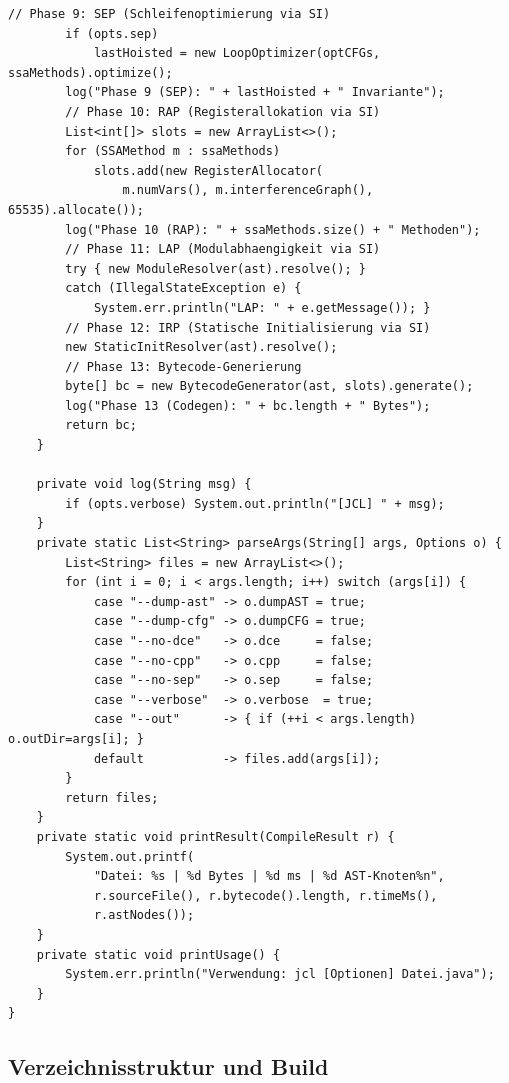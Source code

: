 ﻿\documentclass[a4paper,12pt]{article}
\theoremstyle{definition}
\begin{document}
\begin{lstlisting}[style=javastyle,
    caption={JCLCompiler.java -- vollstaendige 13-Phasen-Pipeline}]
        // Phase 9: SEP (Schleifenoptimierung via SI)
        if (opts.sep)
            lastHoisted = new LoopOptimizer(optCFGs, ssaMethods).optimize();
        log("Phase 9 (SEP): " + lastHoisted + " Invariante");
        // Phase 10: RAP (Registerallokation via SI)
        List<int[]> slots = new ArrayList<>();
        for (SSAMethod m : ssaMethods)
            slots.add(new RegisterAllocator(
                m.numVars(), m.interferenceGraph(), 65535).allocate());
        log("Phase 10 (RAP): " + ssaMethods.size() + " Methoden");
        // Phase 11: LAP (Modulabhaengigkeit via SI)
        try { new ModuleResolver(ast).resolve(); }
        catch (IllegalStateException e) {
            System.err.println("LAP: " + e.getMessage()); }
        // Phase 12: IRP (Statische Initialisierung via SI)
        new StaticInitResolver(ast).resolve();
        // Phase 13: Bytecode-Generierung
        byte[] bc = new BytecodeGenerator(ast, slots).generate();
        log("Phase 13 (Codegen): " + bc.length + " Bytes");
        return bc;
    }

    private void log(String msg) {
        if (opts.verbose) System.out.println("[JCL] " + msg);
    }
    private static List<String> parseArgs(String[] args, Options o) {
        List<String> files = new ArrayList<>();
        for (int i = 0; i < args.length; i++) switch (args[i]) {
            case "--dump-ast" -> o.dumpAST = true;
            case "--dump-cfg" -> o.dumpCFG = true;
            case "--no-dce"   -> o.dce     = false;
            case "--no-cpp"   -> o.cpp     = false;
            case "--no-sep"   -> o.sep     = false;
            case "--verbose"  -> o.verbose  = true;
            case "--out"      -> { if (++i < args.length) o.outDir=args[i]; }
            default           -> files.add(args[i]);
        }
        return files;
    }
    private static void printResult(CompileResult r) {
        System.out.printf(
            "Datei: %s | %d Bytes | %d ms | %d AST-Knoten%n",
            r.sourceFile(), r.bytecode().length, r.timeMs(),
            r.astNodes());
    }
    private static void printUsage() {
        System.err.println("Verwendung: jcl [Optionen] Datei.java");
    }
}
\end{lstlisting}

\subsection{Verzeichnisstruktur und Build}
\end{document}
